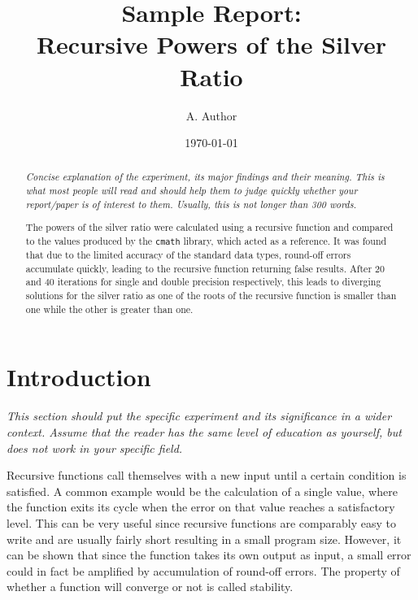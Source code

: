 \documentclass[letterpaper,12pt]{article}
\begin{document}
	\begin{titlepage}
		\title{Sample Report: \\Recursive Powers of the Silver Ratio}
		\author{A. Author}
		\date{\today}
		\maketitle
		
		\thispagestyle{empty} 
		\vfill
		\begin{abstract}
			\textit{Concise explanation of the experiment, its major findings and their meaning. This is what most people will read and should help them to judge quickly whether your report/paper is of interest to them. Usually, this is not longer than 300 words.}
			
		 	The powers of the silver ratio were calculated using a recursive function and compared to the values produced by the \texttt{cmath} library, which acted as a reference. It was found that due to the limited accuracy of the standard data types, round-off errors accumulate quickly, leading to the recursive function returning false results. After 20 and 40 iterations for single and double precision respectively, this leads to diverging solutions for the silver ratio as one of the roots of the recursive function is smaller than one while the other is greater than one.
		\end{abstract}
	\end{titlepage}
	
	
	\section{Introduction}
		\textit{This section should put the specific experiment and its significance in a wider context. Assume that the reader has the same level of education as yourself, but does not work in your specific field.}
		
		Recursive functions call themselves with a new input until a certain condition is satisfied. A common example would be the calculation of a single value, where the function exits its cycle when the error on that value reaches a satisfactory level. This can be very useful since recursive functions are comparably easy to write and are usually fairly short resulting in a small program size. However, it can be shown that since the function takes its own output as input, a small error could in fact be amplified by accumulation of round-off errors. The property of whether a function will converge or not is called stability.\cite{numrecinc}
	
\end{document}
